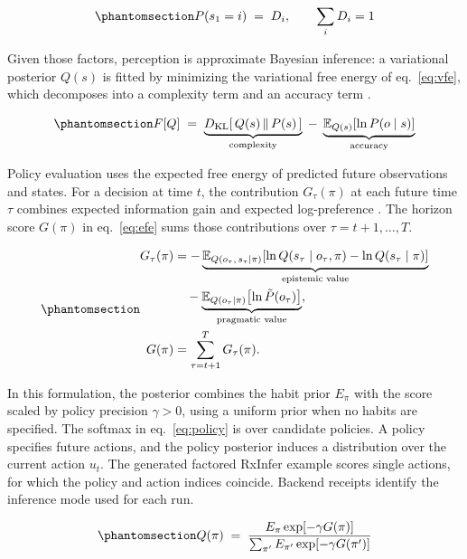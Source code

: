 \documentclass[
  english,
  9pt,
]{extarticle}
\begin{document}
\begin{equation}\protect\phantomsection\label{eq:prior}{P(s_1 = i) \;=\; D_i, \qquad \sum_i D_i = 1}\end{equation}

Given those factors, perception is approximate Bayesian inference: a
variational posterior \(Q(s)\) is fitted by minimizing the variational
free energy of eq.~\ref{eq:vfe}, which decomposes into a complexity term
and an accuracy term \citep{friston2010}.

\begin{equation}\protect\phantomsection\label{eq:vfe}{F[Q] \;=\; \underbrace{D_{\mathrm{KL}}\!\left[\,Q(s) \,\|\, P(s)\,\right]}_{\text{complexity}} \;-\; \underbrace{\mathbb{E}_{Q(s)}\!\left[\ln P(o \mid s)\right]}_{\text{accuracy}}}\end{equation}

Policy evaluation uses the expected free energy of predicted future
observations and states. For a decision at time \(t\), the contribution
\(G_\tau(\pi)\) at each future time \(\tau\) combines expected
information gain and expected log-preference \citep{dacosta2020}. The
horizon score \(G(\pi)\) in eq.~\ref{eq:efe} sums those contributions
over \(\tau=t+1,\ldots,T\).

\begin{equation}\protect\phantomsection\label{eq:efe}{\begin{aligned}
G_\tau(\pi) &= -\underbrace{\mathbb{E}_{Q(o_\tau,\, s_\tau \mid \pi)}\!\left[\ln Q(s_\tau \mid o_\tau, \pi) - \ln Q(s_\tau \mid \pi)\right]}_{\text{epistemic value}} \\
&\quad - \underbrace{\mathbb{E}_{Q(o_\tau \mid \pi)}\!\left[\ln \tilde{P}(o_\tau)\right]}_{\text{pragmatic value}}, \\
G(\pi) &= \sum_{\tau=t+1}^{T} G_\tau(\pi).
\end{aligned}}\end{equation}

In this formulation, the posterior combines the habit prior \(E_\pi\)
with the score scaled by policy precision \(\gamma>0\), using a uniform
prior when no habits are specified. The softmax in eq.~\ref{eq:policy}
is over candidate policies. A policy specifies future actions, and the
policy posterior induces a distribution over the current action \(u_t\).
The generated factored RxInfer example scores single actions, for which
the policy and action indices coincide. Backend receipts identify the
inference mode used for each run.

\begin{equation}\protect\phantomsection\label{eq:policy}{Q(\pi) \;=\; \frac{E_\pi \exp\!\left[-\gamma G(\pi)\right]}{\sum_{\pi'} E_{\pi'} \exp\!\left[-\gamma G(\pi')\right]}}\end{equation}
\end{document}
